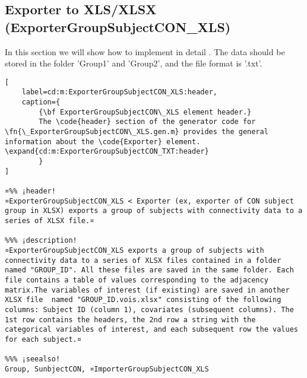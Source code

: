 \documentclass{tufte-handout}
\begin{document}
\clearpage

\subsection{Exporter to XLS/XLSX (ExporterGroupSubjectCON\_XLS)}

In this section we will show how to implement in detail . The data should be stored in the folder 'Group1' and 'Group2', and the file format is '.txt'.

\begin{lstlisting}[
	label=cd:m:ExporterGroupSubjectCON_XLS:header,
	caption={
		{\bf ExporterGroupSubjectCON\_XLS element header.}
		The \code{header} section of the generator code for \fn{\_ExporterGroupSubjectCON\_XLS.gen.m} provides the general information about the \code{Exporter} element. \expand{cd:m:ExporterGroupSubjectCON_TXT:header}
		}
]

¤%% ¡header!
¤ExporterGroupSubjectCON_XLS < Exporter (ex, exporter of CON subject group in XLSX) exports a group of subjects with connectivity data to a series of XLSX file.¤

%%% ¡description!
¤ExporterGroupSubjectCON_XLS exports a group of subjects with connectivity data to a series of XLSX files contained in a folder named "GROUP_ID". All these files are saved in the same folder. Each file contains a table of values corresponding to the adjacency matrix.The variables of interest (if existing) are saved in another XLSX file  named "GROUP_ID.vois.xlsx" consisting of the following columns: Subject ID (column 1), covariates (subsequent columns). The 1st row contains the headers, the 2nd row a string with the categorical variables of interest, and each subsequent row the values for each subject.¤

%%% ¡seealso!
Group, SunbjectCON, ¤ImporterGroupSubjectCON_XLS

\end{lstlisting}
\end{document}
